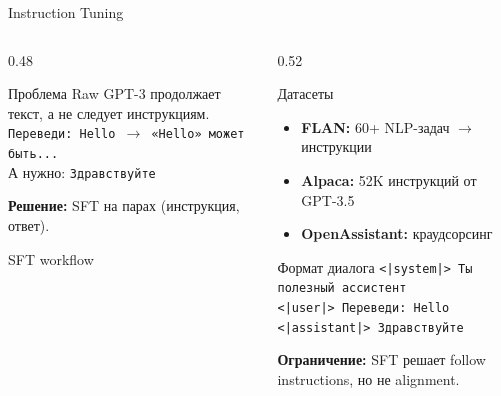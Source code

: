 \documentclass[aspectratio=169, 8pt]{beamer}
\begin{document}
\begin{frame}{Instruction Tuning}
  \begin{columns}[T]
    \begin{column}{0.48\textwidth}
      \begin{block}{Проблема}
        Raw GPT-3 продолжает текст, а не следует инструкциям. \\
        \texttt{Переведи: Hello $\to$ «Hello» может быть...} \\
        А нужно: \texttt{Здравствуйте}
      \end{block}
      \textbf{Решение:} SFT на парах (инструкция, ответ).
      \begin{block}{SFT workflow}
      \end{block}
    \end{column}
    \begin{column}{0.52\textwidth}
      \begin{block}{Датасеты}
        \begin{itemize}
          \item \textbf{FLAN:} 60+ NLP-задач $\to$ инструкции
          \item \textbf{Alpaca:} 52K инструкций от GPT-3.5
          \item \textbf{OpenAssistant:} краудсорсинг
        \end{itemize}
      \end{block}
      \begin{block}{Формат диалога}
        \texttt{<|system|> Ты полезный ассистент} \\
        \texttt{<|user|> Переведи: Hello} \\
        \texttt{<|assistant|> Здравствуйте}
      \end{block}
      \textbf{Ограничение:} SFT решает follow instructions, но не alignment.
    \end{column}
  \end{columns}
\end{frame}
\end{document}

